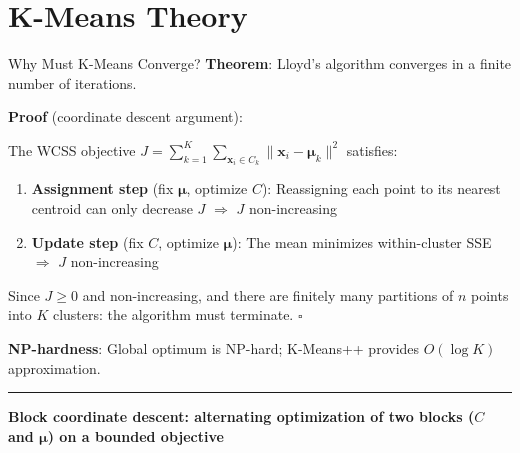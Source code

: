 \documentclass[8pt,aspectratio=169]{beamer}
\newcommand{\bottomnote}[1]{%
\vfill
\vspace{-2mm}
\textcolor{mllavender2}{\rule{\textwidth}{0.4pt}}
\vspace{1mm}
\footnotesize
\textbf{#1}
}
\begin{document}
\section{K-Means Theory}

\begin{frame}[t]{Why Must K-Means Converge?}
\textbf{Theorem}: Lloyd's algorithm converges in a finite number of iterations.
\vspace{0.3em}

\textbf{Proof} (coordinate descent argument):

The WCSS objective $J = \sum_{k=1}^{K}\sum_{\mathbf{x}_i \in C_k} \|\mathbf{x}_i - \boldsymbol{\mu}_k\|^2$ satisfies:
\begin{enumerate}
\item \textbf{Assignment step} (fix $\boldsymbol{\mu}$, optimize $C$): Reassigning each point to its nearest centroid can only decrease $J$ \quad $\Rightarrow$ $J$ non-increasing
\item \textbf{Update step} (fix $C$, optimize $\boldsymbol{\mu}$): The mean minimizes within-cluster SSE \quad $\Rightarrow$ $J$ non-increasing
\end{enumerate}
\vspace{0.3em}
Since $J \geq 0$ and non-increasing, and there are finitely many partitions of $n$ points into $K$ clusters: the algorithm must terminate. \hfill $\square$
\vspace{0.3em}

\textbf{NP-hardness}: Global optimum is NP-hard; K-Means++ provides $O(\log K)$ approximation.
\bottomnote{Block coordinate descent: alternating optimization of two blocks ($C$ and $\boldsymbol{\mu}$) on a bounded objective}
\end{frame}
\end{document}
